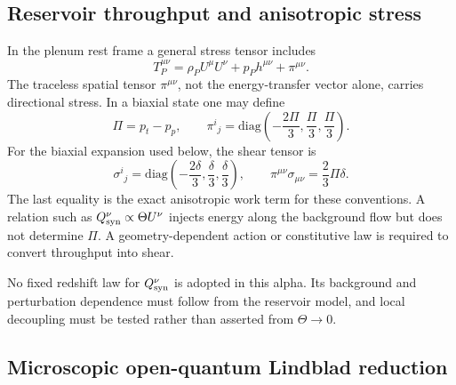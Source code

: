 \subsection{Reservoir throughput and anisotropic stress}

In the plenum rest frame a general stress tensor includes
\begin{equation}
 T_P^{\mu\nu}=\rho_P U^\mu U^\nu+p_Ph^{\mu\nu}+\pi^{\mu\nu}.
 \label{eq:plenum-stress}
\end{equation}
The traceless spatial tensor $\pi^{\mu\nu}$, not the energy-transfer vector
alone, carries directional stress.  In a biaxial state one may define
\begin{equation}
 \Pi=p_t-p_p,
 \qquad
 \pi^i{}_j=\mathrm{diag}\left(-\frac{2\Pi}{3},\frac{\Pi}{3},\frac{\Pi}{3}\right).
 \label{eq:biaxial-pi}
\end{equation}
For the biaxial expansion used below, the shear tensor is
\begin{equation}
 \sigma^i{}_j=\mathrm{diag}\left(-\frac{2\delta}{3},
 \frac{\delta}{3},\frac{\delta}{3}\right),
 \qquad
 \pi^{\mu\nu}\sigma_{\mu\nu}=\frac{2}{3}\Pi\delta.
 \label{eq:anisotropic-work}
\end{equation}
The last equality is the exact anisotropic work term for these conventions.
A relation such as $Q_{\rm syn}^{\nu}\propto\Theta U^\nu$ injects energy along
the background flow but does not determine $\Pi$.  A geometry-dependent
action or constitutive law is required to convert throughput into shear.

No fixed redshift law for $Q_{\rm syn}^{\nu}$ is adopted in this alpha.  Its
background and perturbation dependence must follow from the reservoir model,
and local decoupling must be tested rather than asserted from $\Theta\to0$.

\subsection{Microscopic open-quantum Lindblad reduction}

